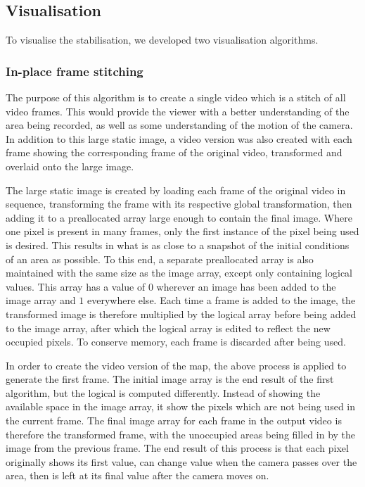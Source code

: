 \subsection{Visualisation}

To visualise the stabilisation, we developed two visualisation algorithms.

\subsubsection{In-place frame stitching}

The purpose of this algorithm is to create a single video which is a stitch of all video frames.
This would provide the viewer with a better understanding of the area being recorded,
as well as some understanding of the motion of the camera.
In addition to this large static image,
a video version was also created
with each frame showing the corresponding frame of the original video,
transformed and overlaid onto the large image.

The large static image is created by loading each frame of the original video in sequence,
transforming the frame with its respective global transformation,
then adding it to a preallocated array large enough to contain the final image.
Where one pixel is present in many frames, only the first instance of the pixel being used is desired.
This results in what is as close to a snapshot of the initial conditions of an area as possible.
To this end, a separate preallocated array is also maintained
with the same size as the image array, except only containing logical values.
This array has a value of $0$ wherever an image has been added to the image array and $1$ everywhere else. 
Each time a frame is added to the image,
the transformed image is therefore multiplied by the logical array before being added to the image array,
after which the logical array is edited to reflect the new occupied pixels.
To conserve memory, each frame is discarded after being used.

In order to create the video version of the map,
the above process is applied to generate the first frame.
The initial image array is the end result of the first algorithm, but the logical is computed differently.
Instead of showing the available space in the image array,
it show the pixels which are not being used in the current frame.
The final image array for each frame in the output video is therefore
the transformed frame, with the unoccupied areas being filled in by the image from the previous frame.
The end result of this process is that each pixel originally shows its first value,
can change value when the camera passes over the area,
then is left at its final value after the camera moves on.

